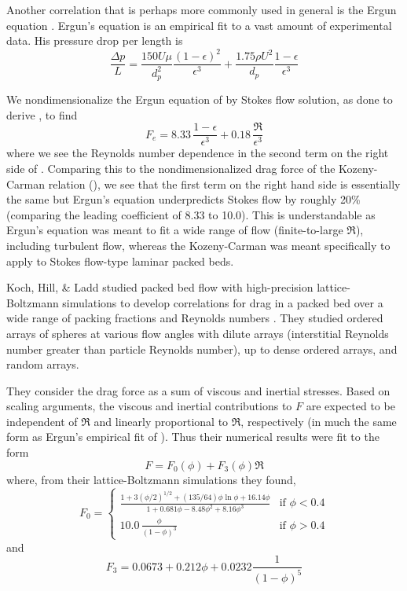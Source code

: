 Another correlation that is perhaps more commonly used in general is the Ergun equation \cite{ergun1952fluid}. Ergun's equation is an empirical fit to a vast amount of experimental data. His pressure drop per length is 
\begin{equation}\label{eq:ergun-pressure}
    \frac{\Delta p}{L} = \frac{150 U \mu}{d_p^2} \frac{(1-\epsilon)^2}{\epsilon^3} + \frac{1.75 \rho U^2}{d_p}\frac{1-\epsilon}{\epsilon^3}
\end{equation}

We nondimensionalize the Ergun equation of  by Stokes flow solution, as done to derive , to find
\begin{equation}\label{eq:ergun-non-dim}
    F_e = 8.33 \, \frac{1-\epsilon}{\epsilon^3} + 0.18 \, \frac{\Re}{\epsilon^3}
\end{equation}
where we see the Reynolds number dependence in the second term on the right side of . Comparing this to the nondimensionalized drag force of the Kozeny-Carman relation (), we see that the first term on the right hand side is essentially the same but Ergun's equation underpredicts Stokes flow by roughly 20\% (comparing the leading coefficient of 8.33 to 10.0). This is understandable as Ergun's equation was meant to fit a wide range of flow (finite-to-large $\Re$), including turbulent flow, whereas the Kozeny-Carman was meant specifically to apply to Stokes flow-type laminar packed beds.

Koch, Hill, \& Ladd studied packed bed flow with high-precision lattice-Boltzmann simulations to develop correlations for drag in a packed bed over a wide range of packing fractions and Reynolds numbers \cite{Koch2001,Hill2001a,Hill2001}. They studied ordered arrays of spheres at various flow angles with dilute arrays (interstitial Reynolds number greater than particle Reynolds number), up to dense ordered arrays, and random arrays.

They consider the drag force as a sum of viscous and inertial stresses. Based on scaling arguments, the viscous and inertial contributions to $F$ are expected to be independent of $\Re$ and linearly proportional to $\Re$, respectively (in much the same form as Ergun's empirical fit of ). Thus their numerical results were fit to the form
\begin{equation}\label{eq:khl-non-dim}
    F = F_0(\phi) + F_3(\phi)\Re
\end{equation}
where, from their lattice-Boltzmann simulations they found,
\begin{equation}\label{eq:khl-f0}
F_0 = \begin{cases}
    \frac{1+3(\phi/2)^{1/2} + (135/64)\phi\ln\phi + 16.14\phi}{1 + 0.681\phi - 8.48 \phi^2 + 8.16\phi^3} & \text{if $\phi < 0.4$}\\
    10.0\,\frac{\phi}{(1-\phi)^3} & \text{if $\phi > 0.4$} 
    \end{cases}
\end{equation}
and
\begin{equation}\label{eq:khl-f3}
    F_3 = 0.0673 + 0.212\phi + 0.0232 \frac{1}{(1-\phi)^5}
\end{equation}

